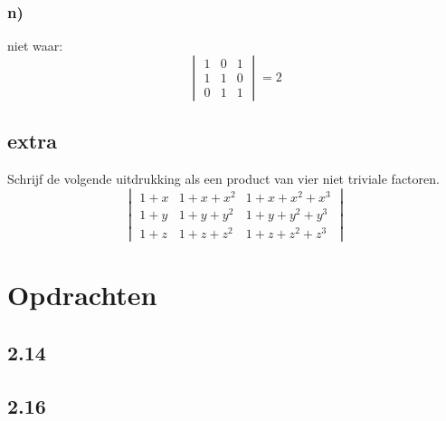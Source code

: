 \documentclass[10pt,a4paper]{article}
\begin{document}
\subsubsection*{n)}
niet waar:
\[
\begin{vmatrix}
1 & 0 & 1\\
1 & 1 & 0\\
0 & 1 & 1
\end{vmatrix}
=2
\]

\subsection*{extra}
Schrijf de volgende uitdrukking als een product van vier niet triviale factoren.
\[
\begin{vmatrix}
1+x & 1+x+x^{2} & 1+x+x^{2}+x^{3}\\
1+y & 1+y+y^{2} & 1+y+y^{2}+y^{3}\\
1+z & 1+z+z^{2} & 1+z+z^{2}+z^{3}
\end{vmatrix}
\]

\section{Opdrachten}
\subsection*{2.14}
\subsection*{2.16}
\end{document}
